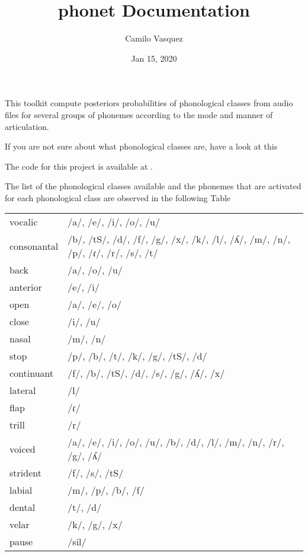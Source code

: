 \documentclass[letterpaper,10pt,english]{sphinxmanual}
\title{phonet Documentation}
\date{Jan 15, 2020}
\author{Camilo Vasquez}
\begin{document}
\maketitle
\sphinxtableofcontents
{}\label{\detokenize{index::doc}}


This toolkit compute posteriors probabilities of phonological classes from audio files for several groups of phonemes according to the mode and manner of articulation.

If you are not sure about what phonological classes are, have a look at this

The code for this project is available at  .

The list of the phonological classes available and the phonemes that are activated for each phonological class are observed in the following Table

\noindent\begin{tabulary}{\linewidth}{|L|L|}
\hline
{}\relax &\relax \\
\hline
vocalic
&
/a/, /e/, /i/, /o/, /u/
\\
\hline
consonantal
&
/b/, /tS/, /d/, /f/, /g/, /x/, /k/, /l/, /ʎ/, /m/, /n/, /p/, /ɾ/, /r/, /s/, /t/
\\
\hline
back
&
/a/, /o/, /u/
\\
\hline
anterior
&
/e/, /i/
\\
\hline
open
&
/a/, /e/, /o/
\\
\hline
close
&
/i/, /u/
\\
\hline
nasal
&
/m/, /n/
\\
\hline
stop
&
/p/, /b/, /t/, /k/, /g/, /tS/, /d/
\\
\hline
continuant
&
/f/, /b/, /tS/, /d/, /s/, /g/, /ʎ/, /x/
\\
\hline
lateral
&
/l/
\\
\hline
flap
&
/ɾ/
\\
\hline
trill
&
/r/
\\
\hline
voiced
&
/a/, /e/, /i/, /o/, /u/, /b/, /d/, /l/, /m/, /n/, /r/, /g/, /ʎ/
\\
\hline
strident
&
/f/, /s/, /tS/
\\
\hline
labial
&
/m/, /p/, /b/, /f/
\\
\hline
dental
&
/t/, /d/
\\
\hline
velar
&
/k/, /g/, /x/
\\
\hline
pause
&
/sil/
\\
\hline\end{tabulary}
\end{document}
